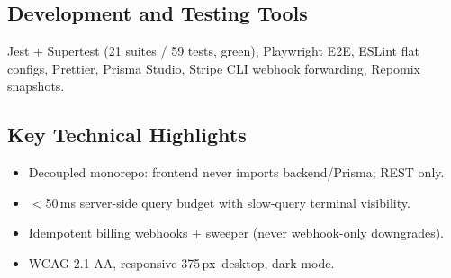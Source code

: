 \subsection{Development and Testing Tools}
Jest + Supertest (21 suites / 59 tests, green), Playwright E2E, ESLint flat
configs, Prettier, Prisma Studio, Stripe CLI webhook forwarding, Repomix
snapshots.

\subsection{Key Technical Highlights}
\begin{itemize}[nosep]
\item Decoupled monorepo: frontend never imports backend/Prisma; REST only.
\item $<$50\,ms server-side query budget with slow-query terminal visibility.
\item Idempotent billing webhooks + sweeper (never webhook-only downgrades).
\item WCAG 2.1 AA, responsive 375\,px--desktop, dark mode.
\end{itemize}
